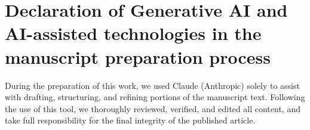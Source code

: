 \documentclass[a4paper,fleqn]{cas-sc}
\begin{document}
\section*{Declaration of Generative AI and AI-assisted technologies in the manuscript preparation process}
During the preparation of this work, we used Claude (Anthropic) solely to assist with drafting, structuring, and refining portions of the manuscript text.
Following the use of this tool, we thoroughly reviewed, verified, and edited all content, and take full responsibility for the final integrity of the published article.

\printcredits



\end{document}
